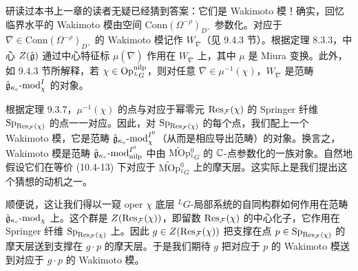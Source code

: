 研读过本书上一章的读者无疑已经猜到答案：它们是 Wakimoto 模！确实，回忆临界水平的 Wakimoto 模由空间 $\mathrm{Conn}(\Omega^{-\rho})_{D^\times}$ 参数化。对应于 $\overline{\nabla}\in\mathrm{Conn}(\Omega^{-\rho})_{D^\times}$ 的 Wakimoto 模记作 $W_{\overline{\nabla}}$（见 9.4.3 节）。根据定理 8.3.3，中心 $Z(\hat{\mathfrak{g}})$ 通过中心特征标 $\mu(\overline{\nabla})$ 作用在 $W_{\overline{\nabla}}$ 上，其中 $\mu$ 是 Miura 变换。此外，如 9.4.3 节所解释，若 $\chi\in\operatorname{Op}^{\mathrm{nilp}}_{{}^L G}$，则对任意 $\overline{\nabla}\in\mu^{-1}(\chi)$，$W_{\overline{\nabla}}$ 是范畴 $\hat{\mathfrak{g}}_{\kappa_c}\text{-}\mathrm{mod}_\chi^I$ 的对象。

根据定理 9.3.7，$\mu^{-1}(\chi)$ 的点与对应于幂零元 $\operatorname{Res}_{\mathcal{F}}(\chi)$ 的 Springer 纤维 $\operatorname{Sp}_{\operatorname{Res}_{\mathcal{F}}(\chi)}$ 的点一一对应。因此，对 $\operatorname{Sp}_{\operatorname{Res}_{\mathcal{F}}(\chi)}$ 的每个点，我们配上一个 Wakimoto 模，它是范畴 $\hat{\mathfrak{g}}_{\kappa_c}\text{-}\mathrm{mod}_\chi^{I^0}$（从而是相应导出范畴）的对象。换言之，Wakimoto 模是范畴 $\hat{\mathfrak{g}}_{\kappa_c}\text{-}\mathrm{mod}_{\mathrm{nilp}}^{I^0}$ 中由 $\widetilde{\mathrm{MOp}}{}^0_{{}^L G}$ 的 $\mathbb{C}$-点参数化的一族对象。自然地假设它们在等价 (10.4-13) 下对应于 $\widetilde{\mathrm{MOp}}{}^0_{{}^L G}$ 上的摩天层。这实际上是我们提出这个猜想的动机之一。

顺便说，这让我们得以一窥 oper $\chi$ 底层 ${}^L G$-局部系统的自同构群如何作用在范畴 $\hat{\mathfrak{g}}_{\kappa_c}\text{-}\mathrm{mod}_\chi$ 上。这个群是 $Z(\operatorname{Res}_{\mathcal{F}}(\chi))$，即留数 $\operatorname{Res}_{\mathcal{F}}(\chi)$ 的中心化子，它作用在 Springer 纤维 $\operatorname{Sp}_{\operatorname{Res}_{\mathcal{F}}(\chi)}$ 上。因此 $g\in Z(\operatorname{Res}_{\mathcal{F}}(\chi))$ 把支撑在点 $p\in\operatorname{Sp}_{\operatorname{Res}_{\mathcal{F}}(\chi)}$ 的摩天层送到支撑在 $g\cdot p$ 的摩天层。于是我们期待 $g$ 把对应于 $p$ 的 Wakimoto 模送到对应于 $g\cdot p$ 的 Wakimoto 模。

